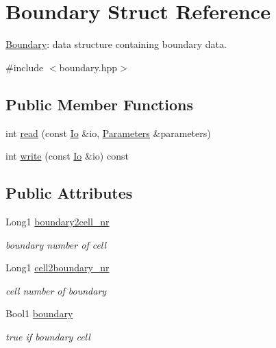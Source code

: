 \hypertarget{structBoundary}{}\section{Boundary Struct Reference}
\label{structBoundary}


\mbox{\hyperlink{structBoundary}{Boundary}}\+: data structure containing boundary data.  




{\ttfamily \#include $<$boundary.\+hpp$>$}

\subsection*{Public Member Functions}
\begin{DoxyCompactItemize}
\item 
int \mbox{\hyperlink{structBoundary_af53b7d529a24315c9c5d637382d0d03e}{read}} (const \mbox{\hyperlink{structIo}{Io}} \&io, \mbox{\hyperlink{classParameters}{Parameters}} \&parameters)
\item 
int \mbox{\hyperlink{structBoundary_a74de4a84e1d8a57c64ff68917382f200}{write}} (const \mbox{\hyperlink{structIo}{Io}} \&io) const
\end{DoxyCompactItemize}
\subsection*{Public Attributes}
\begin{DoxyCompactItemize}
\item 
\mbox{\label{structBoundary_a0e758d96b7b0881f15c083e079705229}} 
Long1 \mbox{\hyperlink{structBoundary_a0e758d96b7b0881f15c083e079705229}{boundary2cell\+\_\+nr}}
\begin{DoxyCompactList}\small\item\em boundary number of cell \end{DoxyCompactList}\item 
\mbox{\label{structBoundary_a7dbbe025d4fa6597465e0179afa1bc80}} 
Long1 \mbox{\hyperlink{structBoundary_a7dbbe025d4fa6597465e0179afa1bc80}{cell2boundary\+\_\+nr}}
\begin{DoxyCompactList}\small\item\em cell number of boundary \end{DoxyCompactList}\item 
\mbox{\label{structBoundary_a5a63e8c6d5b67f46fccb57745f574e29}} 
Bool1 \mbox{\hyperlink{structBoundary_a5a63e8c6d5b67f46fccb57745f574e29}{boundary}}
\begin{DoxyCompactList}\small\item\em true if boundary cell \end{DoxyCompactList}\end{DoxyCompactItemize}


